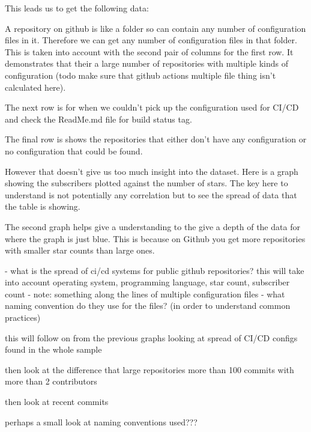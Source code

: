 \documentclass[twoside,12pt,titlepage,a4paper]{article}
\begin{document}
This leads us to get the following data:





A repository on github is like a folder so can contain any number of configuration files in it. Therefore we can get any number of configuration files in that folder. This is taken into account with the second pair of columns for the first row. It demonstrates that their a large number of repositories with multiple kinds of configuration (todo make sure that github actions multiple file thing isn't calculated here).

The next row is for when we couldn't pick up the configuration used for CI/CD and check the ReadMe.md file for build status tag. 

The final row is shows the repositories that either don't have any configuration or no configuration that could be found.

However that doesn't give us too much insight into the dataset. Here is a graph showing the subscribers plotted against the number of stars. The key here to understand is not potentially any correlation but to see the spread of data that the table is showing. 


The second graph helps give a understanding to the give a depth of the data for where the graph is just blue. This is because on Github you get more repositories with smaller star counts than large ones.



- what is the spread of ci/cd systems for public github repositories? this will take into account operating system, programming language, star count, subscriber count
- note: something along the lines of multiple configuration files
- what naming convention do they use for the files? (in order to understand common practices)





this will follow on from the previous graphs looking at spread of CI/CD configs found in the whole sample

then look at the difference that large repositories more than 100 commits with more than 2 contributors

then look at recent commits

perhaps a small look at naming conventions used???
\end{document}

